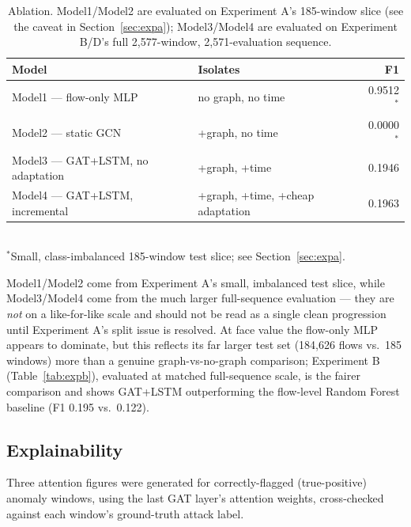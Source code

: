 \documentclass[twocolumn]{llncs}
\begin{document}
\begin{table}[t]
\centering
\caption{Ablation. Model1/Model2 are evaluated on Experiment A's 185-window slice (see the
caveat in Section~\ref{sec:expa}); Model3/Model4 are evaluated on Experiment B/D's full
2{,}577-window, 2{,}571-evaluation sequence.}
\label{tab:ablation}
\small
\begin{tabular}{|p{3.5cm}|p{3.2cm}|r|}
\hline
Model & Isolates & F1 \\
\hline
Model1 --- flow-only MLP           & no graph, no time                         & 0.9512$^{*}$ \\
Model2 --- static GCN               & +graph, no time                            & 0.0000$^{*}$ \\
Model3 --- GAT+LSTM, no adaptation  & +graph, +time                              & 0.1946 \\
Model4 --- GAT+LSTM, incremental    & +graph, +time, +cheap adaptation          & 0.1963 \\
\hline
\end{tabular}
\\[2pt]
\footnotesize{$^{*}$Small, class-imbalanced 185-window test slice; see Section~\ref{sec:expa}.}
\end{table}

Model1/Model2 come from Experiment A's small, imbalanced test slice, while Model3/Model4 come from
the much larger full-sequence evaluation --- they are \emph{not} on a like-for-like scale and
should not be read as a single clean progression until Experiment A's split issue is resolved. At
face value the flow-only MLP appears to dominate, but this reflects its far larger test set
(184{,}626 flows vs.\ 185 windows) more than a genuine graph-vs-no-graph comparison; Experiment B
(Table~\ref{tab:expb}), evaluated at matched full-sequence scale, is the fairer comparison and
shows GAT+LSTM outperforming the flow-level Random Forest baseline (F1 0.195 vs.\ 0.122).

\subsection{Explainability}
\label{sec:explain}

Three attention figures were generated for correctly-flagged (true-positive) anomaly windows, using
the last GAT layer's attention weights, cross-checked against each window's ground-truth attack
label.
\end{document}
